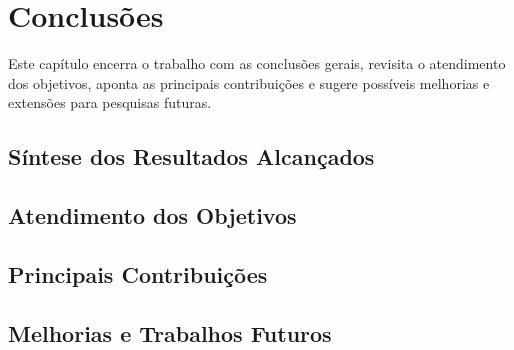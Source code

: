 \chapter{Conclusões}

Este capítulo encerra o trabalho com as conclusões gerais, revisita o atendimento dos objetivos, aponta as principais contribuições e sugere possíveis melhorias e extensões para pesquisas futuras.

\section{Síntese dos Resultados Alcançados}

\section{Atendimento dos Objetivos}

\section{Principais Contribuições}

\section{Melhorias e Trabalhos Futuros}
